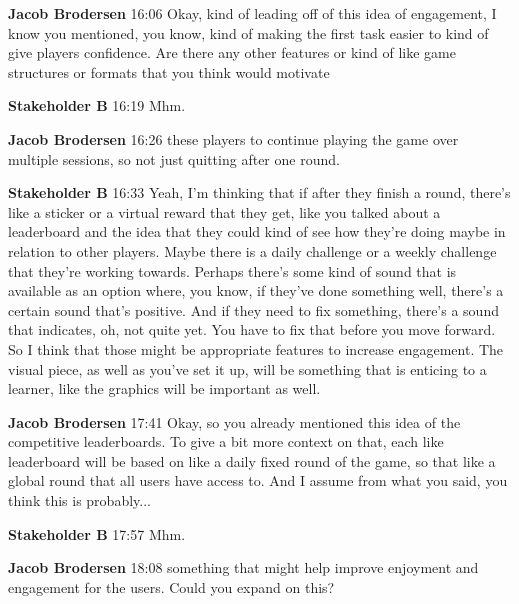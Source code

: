 \documentclass{article}
\begin{document}
\noindent \textbf{Jacob Brodersen}   16:06
Okay, kind of leading off of this idea of engagement, I know you mentioned, you know, kind of making the first task easier to kind of give players confidence. Are there any other features or kind of like game structures or formats that you think would motivate

\noindent \textbf{Stakeholder B}   16:19
Mhm.

\noindent \textbf{Jacob Brodersen}   16:26
these players to continue playing the game over multiple sessions, so not just quitting after one round.

\noindent \textbf{Stakeholder B}   16:33
Yeah, I'm thinking that if after they finish a round, there's like a sticker or a virtual reward that they get, like you talked about a leaderboard and the idea that they could kind of see how they're doing maybe in relation to other players.
Maybe there is a daily challenge or a weekly challenge that they're working towards. Perhaps there's some kind of sound that is available as an option where, you know, if they've done something well, there's a certain sound that's positive. And if they
need to fix something, there's a sound that indicates, oh, not quite yet. You have to fix that before you move forward. So I think that those might be appropriate features to increase engagement. The visual piece, as well as you've set it up, will
be something that is enticing to a learner, like the graphics will be important as well.

\noindent \textbf{Jacob Brodersen}   17:41
Okay, so you already mentioned this idea of the competitive leaderboards.
To give a bit more context on that, each like leaderboard will be based on like a daily fixed round of the game, so that like a global round that all users have access to. And I assume from what you said, you think this is probably...

\noindent \textbf{Stakeholder B}   17:57
Mhm.

\noindent \textbf{Jacob Brodersen}   18:08
something that might help improve enjoyment and engagement for the users. Could you expand on this?
\end{document}
